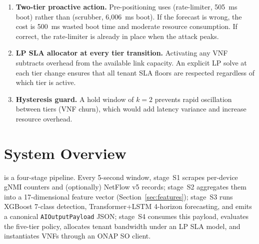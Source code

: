 \begin{enumerate}
  \item \textbf{Two-tier proactive action.} Pre-positioning uses
         (rate-limiter, 505~ms boot) rather than 
        (scrubber, 6{,}006~ms boot). If the forecast is wrong, the
        cost is 500~ms wasted boot time and moderate resource consumption.
        If correct, the rate-limiter is already in place when the attack
        peaks.

  \item \textbf{LP SLA allocator at every tier transition.} Activating
        any VNF subtracts overhead from the available link capacity.
        An explicit LP solve at each tier change ensures that all tenant
        SLA floors are respected regardless of which tier is active.

  \item \textbf{Hysteresis guard.} A hold window of $k{=}2$ prevents
        rapid oscillation between tiers (VNF churn), which would add
        latency variance and increase resource overhead.
\end{enumerate}

\section{System Overview}
\label{sec:arch-overview}

\padonap{} is a four-stage pipeline. Every 5-second window, stage~S1
scrapes per-device gNMI counters and (optionally) NetFlow v5 records;
stage~S2 aggregates them into a 17-dimensional feature vector
(Section~\ref{sec:features}); stage~S3 runs XGBoost 7-class detection,
Transformer+LSTM 4-horizon forecasting, and emits a canonical
\texttt{AIOutputPayload} JSON; stage~S4 consumes this payload, evaluates
the five-tier policy, allocates tenant bandwidth under an LP SLA model,
and instantiates VNFs through an ONAP SO client.


